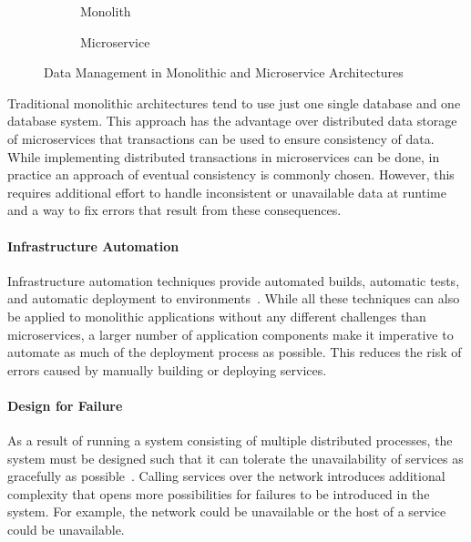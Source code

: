 \begin{figure}[!htb]
    \centering
    \begin{subfigure}{.5\textwidth}
        \centering
        
        \caption{Monolith}\label{fig:sub1}
    \end{subfigure}%
    \begin{subfigure}{.5\textwidth}
        \centering
        
        \caption{Microservice}\label{fig:sub2}
    \end{subfigure}
    \caption{Data Management in Monolithic and Microservice Architectures~\cite{Lewis2014}}\label{fig:test}
\end{figure}

Traditional monolithic architectures tend to use just one single database and one database system.
This approach has the advantage over distributed data storage of microservices that transactions can be used to ensure consistency of data.
While implementing distributed transactions in microservices can be done, in practice an approach of eventual consistency is commonly chosen.
However, this requires additional effort to handle inconsistent or unavailable data at runtime and a way to fix errors that result from these consequences. 

\paragraph{Infrastructure Automation}

Infrastructure automation techniques provide automated builds, automatic tests, and automatic deployment to environments~\cite{Lewis2014}.
While all these techniques can also be applied to monolithic applications without any different challenges than microservices, a larger number of application components make it imperative to automate as much of the deployment process as possible.
This reduces the risk of errors caused by manually building or deploying services.

\paragraph{Design for Failure}

As a result of running a system consisting of multiple distributed processes, the system must be designed such that it can tolerate the unavailability of services as gracefully as possible~\cite{Lewis2014}.
Calling services over the network introduces additional complexity that opens more possibilities for failures to be introduced in the system.
For example, the network could be unavailable or the host of a service could be unavailable.

